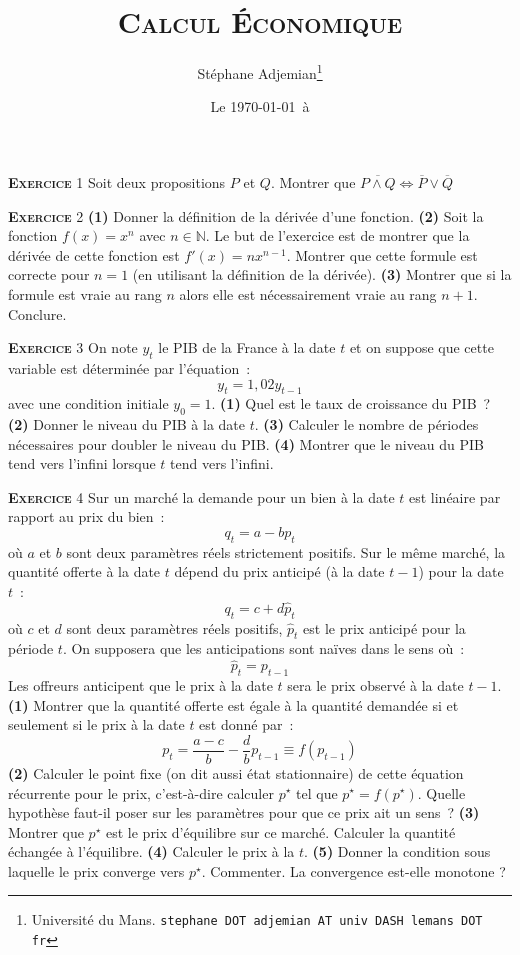 \documentclass[10pt,a4paper,notitlepage]{article}
\newcommand{\exercice}[1]{\textsc{\textbf{Exercice}} #1}
\begin{document}
\title{\textsc{Calcul Économique}}
\author{Stéphane Adjemian\thanks{Université du Mans. \texttt{stephane DOT adjemian AT univ DASH lemans DOT fr}}}
\date{Le \today\ à \thistime}

\maketitle

\exercice{1} Soit deux propositions $P$ et $Q$. Montrer que $\overline
{P \land Q} \Leftrightarrow \overline{P} \lor \overline{Q}$ 

\bigskip

\exercice{2} \textbf{(1)} Donner la définition de la dérivée d'une
fonction. \textbf{(2)} Soit la fonction $f(x) = x^n$ avec
$n\in\mathbb N$. Le but de l'exercice est de montrer que la dérivée de
cette fonction est $f'(x) = nx^{n-1}$. Montrer que cette formule est
correcte pour $n=1$ (en utilisant la définition de la
dérivée). \textbf{(3)} Montrer que si la formule est vraie au rang $n$
alors elle est nécessairement vraie au rang $n+1$. Conclure.

\bigskip

\exercice{3} On note $y_t$ le PIB de la France à la date $t$ et on
suppose que cette variable est déterminée par  l'équation :
\[
y_t = 1,02 y_{t-1}
\]
avec une condition initiale $y_0 = 1$. \textbf{(1)} Quel est le taux
de croissance du PIB ? \textbf{(2)} Donner le niveau du PIB à la date
$t$. \textbf{(3)} Calculer le nombre de périodes nécessaires pour
doubler le niveau du PIB. \textbf{(4)} Montrer que le
niveau du PIB tend vers l'infini lorsque $t$ tend vers l'infini.

\bigskip

\exercice{4} Sur un marché la demande pour un bien à la date $t$ est linéaire par
rapport au prix du bien :
\[
q_t = a - b p_t
\]
où $a$ et $b$ sont deux paramètres réels strictement positifs. Sur le même marché,
la quantité offerte à la date $t$ dépend du prix anticipé (à la date
$t-1$) pour la date $t$ :
\[
q_t = c + d \hat p_t
\]
où $c$ et $d$ sont deux paramètres réels positifs, $\hat p_t$ est le
prix anticipé pour la période $t$. On supposera que les anticipations
sont naïves dans le sens où :
\[
\hat p_t = p_{t-1}
\]
Les offreurs anticipent que le prix à la date $t$ sera le prix observé
à la date $t-1$. \textbf{(1)} Montrer que la quantité offerte est
égale à la quantité demandée si et seulement si le prix à la date $t$
est donné par :
\[
p_t = \frac{a-c}{b} - \frac{d}{b} p_{t-1} \equiv f(p_{t-1})
\]
\textbf{(2)} Calculer le point fixe (on dit aussi état stationnaire)
de cette équation récurrente pour le prix, c'est-à-dire calculer
$p^{\star}$ tel que $p^{\star} = f(p^{\star})$. Quelle hypothèse
faut-il poser sur les paramètres pour que ce prix ait un sens ? \textbf{(3)}
Montrer que $p^{\star}$ est le prix d'équilibre sur ce
marché. Calculer la quantité échangée à l'équilibre. \textbf{(4)}
Calculer le prix à la $t$. \textbf{(5)} Donner la condition sous
laquelle le prix converge vers $p^{\star}$. Commenter. La convergence
est-elle monotone ?
\end{document}

